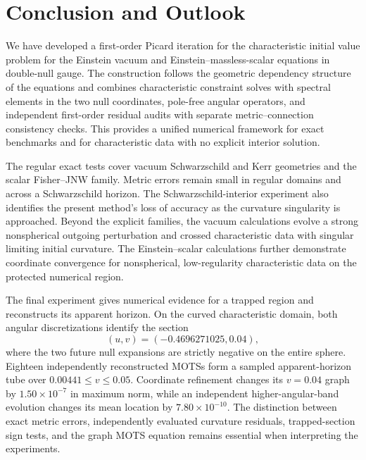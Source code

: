 \section[Conclusion and Outlook]{\hspace{0.4em}Conclusion and Outlook}%
\label{sec:conclusion}

We have developed a first-order Picard iteration for the characteristic
initial value problem for the Einstein vacuum and Einstein--massless-scalar
equations in double-null gauge.  The construction follows the geometric
dependency structure of the equations and combines characteristic constraint
solves with spectral elements in the two null coordinates, pole-free angular
operators, and independent first-order residual audits with separate
metric--connection consistency checks.  This provides a unified
numerical framework for exact benchmarks and for characteristic data with no
explicit interior solution.

The regular exact tests cover vacuum Schwarzschild and Kerr geometries and the
scalar Fisher--JNW family.  Metric errors remain small in regular domains and
across a Schwarzschild horizon.  The Schwarzschild-interior experiment also
identifies the present method's loss of accuracy as the curvature singularity
is approached.  Beyond the explicit families, the vacuum calculations evolve
a strong nonspherical outgoing perturbation and crossed characteristic data
with singular limiting initial curvature.  The Einstein--scalar calculations
further demonstrate
coordinate convergence for nonspherical, low-regularity characteristic data
on the protected numerical region.

The final experiment gives numerical evidence for a trapped region and
reconstructs its apparent horizon.  On the curved characteristic domain, both
angular discretizations identify the section
\begin{equation}
  (u,v)=(-0.4696271025,0.04),
\end{equation}
where the two future null expansions are strictly negative on the entire
sphere.  Eighteen independently reconstructed MOTSs form a sampled
apparent-horizon tube over $0.00441\leq v\leq0.05$.  Coordinate refinement
changes its $v=0.04$ graph by $1.50\times10^{-7}$ in maximum norm, while an
independent higher-angular-band evolution changes its mean location by
$7.80\times10^{-10}$.  The distinction between exact metric errors,
independently evaluated curvature residuals, trapped-section sign tests, and
the graph MOTS equation remains essential when interpreting the experiments.


